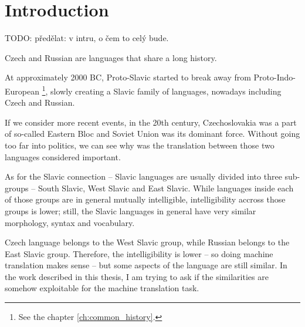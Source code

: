 \chapter*{Introduction}

TODO: předělat: v intru, o čem to celý bude.

Czech and Russian are languages that share a long history.

At approximately 2000 BC, Proto-Slavic started to break away from Proto-Indo-European
\footnote{See the chapter \ref{ch:common_history}.}, slowly creating a Slavic family of languages, nowadays including Czech and Russian.

If we consider more recent events, in the 20th century, Czechoslovakia was a part of so-called Eastern Bloc and Soviet Union was its dominant force. Without going too far into politics, we can see why was the translation between those two languages considered important.

As for the Slavic connection -- Slavic languages are usually divided into three sub-groups -- South Slavic, West Slavic and East Slavic. While languages inside each of those groups are in general mutually intelligible, intelligibility accross those groups is lower; still, the Slavic languages in general have very similar morphology, syntax and vocabulary. 

Czech language belongs to the West Slavic group, while Russian belongs to the East Slavic group. Therefore, the intelligibility is lower -- so doing machine translation makes sense -- but some aspects of the language are still similar. In the work described in this thesis, I am trying to ask if the similarities are somehow exploitable for the machine translation task.


